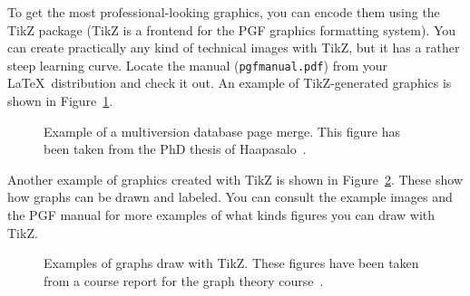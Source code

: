 To get the most professional-looking graphics, you can encode them using the
TikZ package (TikZ is a frontend for the PGF graphics formatting system).
You can create practically any kind of technical images with TikZ, but it has a
rather steep learning curve. Locate the manual (\texttt{pgfmanual.pdf}) from
your \LaTeX\ distribution and check it out. An example of TikZ-generated
graphics is shown in Figure~\ref{fig:page-merge}.

\begin{figure}[ht]
  \begin{center}
    
    \caption{Example of a multiversion database page merge. This figure has
    been taken from the PhD thesis of Haapasalo~\cite{HaapasaloThesis}.}
    \label{fig:page-merge}
  \end{center}
\end{figure}

Another example of graphics created with TikZ is shown in
Figure~\ref{fig:tikz-examples}.
These show how graphs can be drawn and labeled.
You can consult the example images and the PGF manual for more examples of what
kinds figures you can draw with TikZ.

\newlength{\graphdotsize}
\setlength{\graphdotsize}{1.7pt}
\newlength{\graphgridsize}
\setlength{\graphgridsize}{1.2em}
\begin{figure}[ht]
\begin{center}
\caption{Examples of graphs draw with TikZ. These figures have been taken from a
course report for the graph theory course~\cite{FerryProblem}.}
\label{fig:tikz-examples}
\end{center}
\end{figure}
